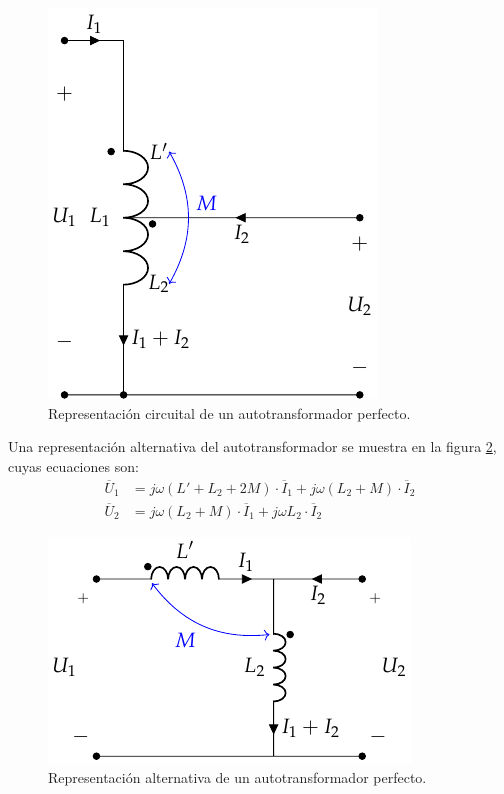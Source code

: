 \begin{figure}\centering
  \includegraphics[height=0.25\textheight]{../figs/AutotrafoPerfecto.pdf}
  \caption{Representación circuital de un autotransformador perfecto.}
  \label{fig:autotrafo-perfecto}
\end{figure}

Una representación alternativa del autotransformador se muestra en la figura \ref{fig:autotrafo-perfecto2}, cuyas ecuaciones son:
\begin{align*}
  \overline{U}_1 &= j \omega (L' + L_2 + 2M) \cdot \overline{I}_1 + j \omega (L_2 + M) \cdot \overline{I}_2\\
  \overline{U}_2 &= j \omega (L_2 + M) \cdot \overline{I}_1 + j \omega L_2 \cdot \overline{I}_2
\end{align*}

\begin{figure}
  \centering
  \includegraphics[height=0.25\textheight]{../figs/AutotrafoPerfecto2.pdf}
  \caption{Representación alternativa de un autotransformador perfecto.}
  \label{fig:autotrafo-perfecto2}
\end{figure}

